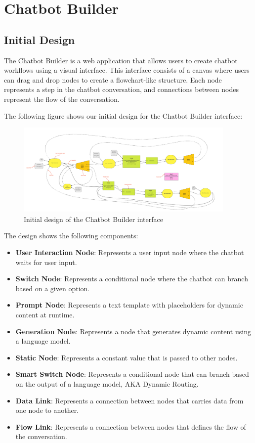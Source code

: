 \section{Chatbot Builder}

\subsection {Initial Design}
The Chatbot Builder is a web application that allows users to create chatbot workflows using a visual interface. This interface consists of a canvas where users can drag and drop nodes to create a flowchart-like structure. Each node represents a step in the chatbot conversation, and connections between nodes represent the flow of the conversation.

The following figure shows our initial design for the Chatbot Builder interface:

\begin{figure}[H]
    \centering
    \includegraphics[width=0.95\textwidth]{assets/ChatbotBuilder_Sketch.jpg}
    \caption{Initial design of the Chatbot Builder interface}
    \label{fig:chatbot_builder}
\end{figure}

The design shows the following components:
\begin{itemize}
    \item \textbf{User Interaction Node}: Represents a user input node where the chatbot waits for user input.
    \item \textbf{Switch Node}: Represents a conditional node where the chatbot can branch based on a given option.
    \item \textbf{Prompt Node}: Represents a text template with placeholders for dynamic content at runtime.
    \item \textbf{Generation Node}: Represents a node that generates dynamic content using a language model.
    \item \textbf{Static Node}: Represents a constant value that is passed to other nodes.
    \item \textbf{Smart Switch Node}: Represents a conditional node that can branch based on the output of a language model, AKA Dynamic Routing.
    \item \textbf{Data Link}: Represents a connection between nodes that carries data from one node to another.
    \item \textbf{Flow Link}: Represents a connection between nodes that defines the flow of the conversation.
\end{itemize}


